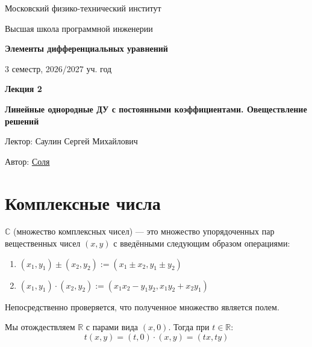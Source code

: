 \documentclass[11pt]{article}
\newcommand{\lectureNumber}{2}
\newcommand{\lectureTitle}{Линейные однородные ДУ с постоянными коэффициентами. Овеществление решений}
\newcommand{\courseName}{Элементы дифференциальных уравнений}
\newcommand{\semester}{3 семестр, 2026/2027 уч. год}
\begin{document}
\begin{titlepage}
  \centering
  
  {\large Московский физико-технический институт \par}
  {\large Высшая школа программной инженерии \par}
  \vspace{2cm}

  {\Large \textbf{\courseName} \par}
  {\large \semester \par}
  
  \vspace*{\fill}

  {\Huge \textbf{Лекция \lectureNumber} \par}
  {\Huge \textbf{\lectureTitle} \par}
  
  \vspace*{\fill}
  
  {\large Лектор: Саулин Сергей Михайлович \par}
  {\large Автор: \href{t.me/sol_m_07}{Соля} \par}

\end{titlepage}


\section{Комплексные числа}

\begin{definition}
  $\mathbb{C}$ (множество комплексных чисел) --- это множество упорядоченных пар вещественных чисел $(x, y)$ с введёнными следующим образом операциями:
  \begin{enumerate}
    \item $(x_1, y_1) \pm (x_2, y_2) := (x_1 \pm x_2, y_1 \pm y_2)$
    \item $(x_1, y_1) \cdot (x_2, y_2) := (x_1 x_2 - y_1  y_2, x_1  y_2 + x_2  y_1)$
  \end{enumerate} 
\end{definition}

\begin{remark}
  Непосредственно проверяется, что полученное множество является полем.
\end{remark}

\begin{remark}
  Мы отождествляем $\mathbb{R}$ с парами вида $(x, 0)$. Тогда при $t \in \mathbb{R}$: \[t (x, y) = (t, 0) \cdot (x, y) = (tx, ty)\]
\end{remark}
\end{document}
